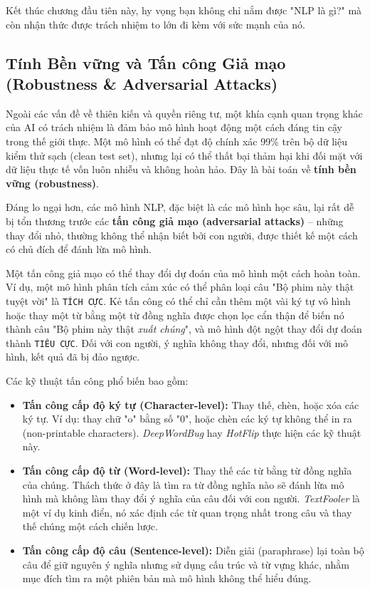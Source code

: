 Kết thúc chương đầu tiên này, hy vọng bạn không chỉ nắm được "NLP là gì?" mà còn nhận thức được trách nhiệm to lớn đi kèm với sức mạnh của nó.

\subsection{Tính Bền vững và Tấn công Giả mạo (Robustness \& Adversarial Attacks)}
\label{ssec:robustness_adversarial_attacks}

Ngoài các vấn đề về thiên kiến và quyền riêng tư, một khía cạnh quan trọng khác của AI có trách nhiệm là đảm bảo mô hình hoạt động một cách đáng tin cậy trong thế giới thực. Một mô hình có thể đạt độ chính xác 99\% trên bộ dữ liệu kiểm thử sạch (clean test set), nhưng lại có thể thất bại thảm hại khi đối mặt với dữ liệu thực tế vốn luôn nhiễu và không hoàn hảo. Đây là bài toán về \textbf{tính bền vững (robustness)}.

Đáng lo ngại hơn, các mô hình NLP, đặc biệt là các mô hình học sâu, lại rất dễ bị tổn thương trước các \textbf{tấn công giả mạo (adversarial attacks)} -- những thay đổi nhỏ, thường không thể nhận biết bởi con người, được thiết kế một cách có chủ đích để đánh lừa mô hình.

\begin{tcolorbox}[
    title={Sự Mong manh của các Mô hình "Thông minh"},
    colback=blue!5!white,
    colframe=blue!75!black,
    fonttitle=\bfseries
]
Một tấn công giả mạo có thể thay đổi dự đoán của mô hình một cách hoàn toàn. Ví dụ, một mô hình phân tích cảm xúc có thể phân loại câu "Bộ phim này thật tuyệt vời" là \texttt{TÍCH CỰC}. Kẻ tấn công có thể chỉ cần thêm một vài ký tự vô hình hoặc thay một từ bằng một từ đồng nghĩa được chọn lọc cẩn thận để biến nó thành câu "Bộ phim này thật \textit{xuất chúng}", và mô hình đột ngột thay đổi dự đoán thành \texttt{TIÊU CỰC}. Đối với con người, ý nghĩa không thay đổi, nhưng đối với mô hình, kết quả đã bị đảo ngược.
\end{tcolorbox}

Các kỹ thuật tấn công phổ biến bao gồm:
\begin{itemize}
    \item \textbf{Tấn công cấp độ ký tự (Character-level):} Thay thế, chèn, hoặc xóa các ký tự. Ví dụ: thay chữ "o" bằng số "0", hoặc chèn các ký tự không thể in ra (non-printable characters). \textit{DeepWordBug} \cite{gao2018black} hay \textit{HotFlip} \cite{ebrahimi2017hotflip} thực hiện các kỹ thuật này.
    \item \textbf{Tấn công cấp độ từ (Word-level):} Thay thế các từ bằng từ đồng nghĩa của chúng. Thách thức ở đây là tìm ra từ đồng nghĩa nào sẽ đánh lừa mô hình mà không làm thay đổi ý nghĩa của câu đối với con người. \textit{TextFooler} \cite{jin2020bert} là một ví dụ kinh điển, nó xác định các từ quan trọng nhất trong câu và thay thế chúng một cách chiến lược.
    \item \textbf{Tấn công cấp độ câu (Sentence-level):} Diễn giải (paraphrase) lại toàn bộ câu để giữ nguyên ý nghĩa nhưng sử dụng cấu trúc và từ vựng khác, nhằm mục đích tìm ra một phiên bản mà mô hình không thể hiểu đúng.
\end{itemize}

